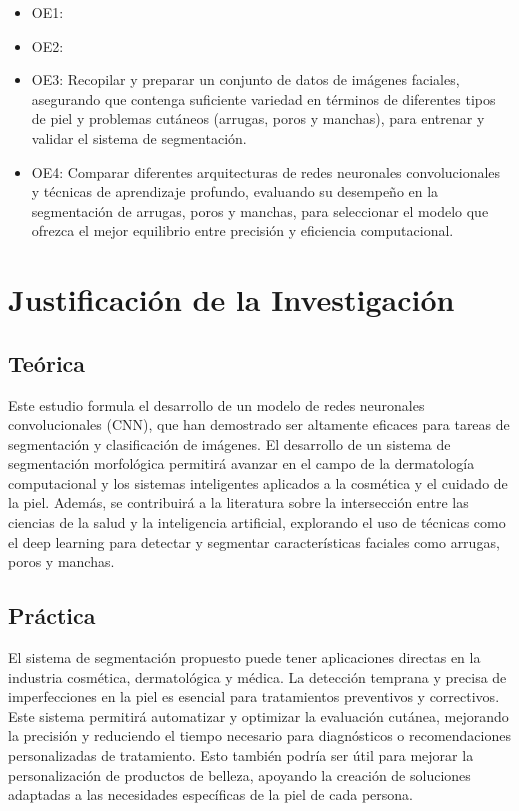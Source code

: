 \newcommand{\Objthree}{
Recopilar y preparar un conjunto de datos de imágenes faciales, asegurando que contenga suficiente variedad en términos de diferentes tipos de piel y problemas cutáneos (arrugas, poros y manchas), para entrenar y validar el sistema de segmentación.
}
\newcommand{\Objfour}{
Comparar diferentes arquitecturas de redes neuronales convolucionales y técnicas de aprendizaje profundo, evaluando su desempeño en la segmentación de arrugas, poros y manchas, para seleccionar el modelo que ofrezca el mejor equilibrio entre precisión y eficiencia computacional.
}

\begin{itemize}
	\item OE1: {\Objone}
	\item OE2: {\Objtwo}
	\item OE3: {\Objthree}
	\item OE4: {\Objfour}
\end{itemize}



\section{Justificación de la Investigación}

\subsection{Teórica}
Este estudio formula el desarrollo de un modelo de redes neuronales convolucionales (CNN), que han demostrado ser altamente eficaces para tareas de segmentación y clasificación de imágenes. El desarrollo de un sistema de segmentación morfológica permitirá avanzar en el campo de la dermatología computacional y los sistemas inteligentes aplicados a la cosmética y el cuidado de la piel. Además, se contribuirá a la literatura sobre la intersección entre las ciencias de la salud y la inteligencia artificial, explorando el uso de técnicas como el deep learning para detectar y segmentar características faciales como arrugas, poros y manchas.

\subsection{Práctica}
El sistema de segmentación propuesto puede tener aplicaciones directas en la industria cosmética, dermatológica y médica. La detección temprana y precisa de imperfecciones en la piel es esencial para tratamientos preventivos y correctivos. Este sistema permitirá automatizar y optimizar la evaluación cutánea, mejorando la precisión y reduciendo el tiempo necesario para diagnósticos o recomendaciones personalizadas de tratamiento. Esto también podría ser útil para mejorar la personalización de productos de belleza, apoyando la creación de soluciones adaptadas a las necesidades específicas de la piel de cada persona.

